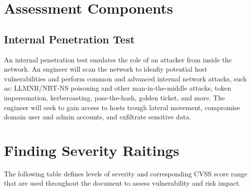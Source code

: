 \documentclass[a4paper]{article} %
\newcommand{\clientName}{Demo Corp}
\newcommand{\theAuthor}{Elliot Alderson}
\newcommand{\startDatePentest}{08 de Marzo del 2024}
\newcommand{\finalDatePentest}{12 de Marzo del 2024}
\begin{document}



    \section{Assessment Components}
    \subsection{Internal Penetration Test}
    An internal penetration test emulates the role of an attacker from inside the network. An engineer will scan the network to idenfiy potential host vulnerabilities and perform common and advanced internal network attacks, such as: LLMNR/NBT-NS poisoning and other man-in-the-middle attacks, token impersonation, kerberoasting, pass-the-hash, golden ticket, and more. The engineer will seek to gain access to hosts trough lateral movement, compromise domain user and admin accounts, and exfiltrate sensitive data.

    \clearpage
    \section{Finding Severity Raitings}
    The following table defines levels of severity and corresponding CVSS score range that are used throughout the document to assess vulnerability and risk impact.
    \vspace{0.3cm}
\end{document}
